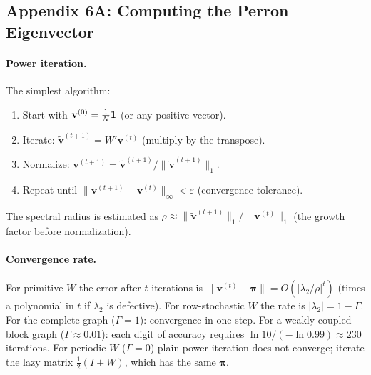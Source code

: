 \documentclass[../structural_economics_book.tex]{subfiles}
\begin{document}
\subsection*{Appendix 6A: Computing the Perron Eigenvector}
\label{ch06:app:computing}

\paragraph{Power iteration.} The simplest algorithm:
\begin{enumerate}
\item Start with $\mathbf{v}^{(0)} = \frac{1}{N}\mathbf{1}$ (or any positive vector).
\item Iterate: $\tilde{\mathbf{v}}^{(t+1)} = W' \mathbf{v}^{(t)}$ (multiply by the transpose).
\item Normalize: $\mathbf{v}^{(t+1)} = \tilde{\mathbf{v}}^{(t+1)} / \|\tilde{\mathbf{v}}^{(t+1)}\|_1$.
\item Repeat until $\|\mathbf{v}^{(t+1)} - \mathbf{v}^{(t)}\|_\infty < \varepsilon$ (convergence tolerance).
\end{enumerate}

The spectral radius is estimated as $\rho \approx \|\tilde{\mathbf{v}}^{(t+1)}\|_1 / \|\mathbf{v}^{(t)}\|_1$ (the growth factor before normalization).

\paragraph{Convergence rate.} For primitive $W$ the error after $t$ iterations is $\|\mathbf{v}^{(t)} - \boldsymbol{\pi}\| = O(|\lambda_2/\rho|^t)$ (times a polynomial in $t$ if $\lambda_2$ is defective). For row-stochastic $W$ the rate is $|\lambda_2| = 1 - \Gamma$. For the complete graph ($\Gamma = 1$): convergence in one step. For a weakly coupled block graph ($\Gamma \approx 0.01$): each digit of accuracy requires $\ln 10/(-\ln 0.99) \approx 230$ iterations. For periodic $W$ ($\Gamma = 0$) plain power iteration does not converge; iterate the lazy matrix $\frac12(I+W)$, which has the same $\boldsymbol{\pi}$.
\end{document}
